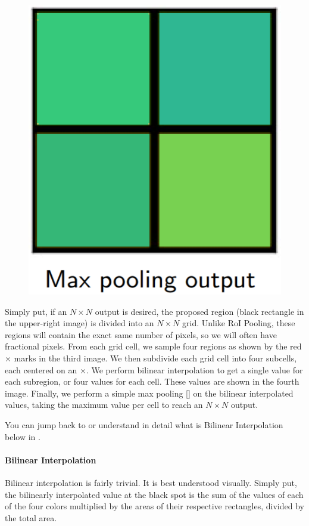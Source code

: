 \begin{figure}[H]
	\centering
	\includegraphics[scale=0.35]{images/roialign5.PNG}
\end{figure}

Simply put, if an $N\times N$ output is desired, the proposed region (black rectangle in the upper-right image) is divided into an $N\times N$ grid. Unlike RoI Pooling, these regions will contain the exact same number of pixels, so we will often have fractional pixels. From each grid cell, we sample four regions as shown by the red $\times$ marks in the third image. We then subdivide each grid cell into four subcells, each centered on an $\times$. We perform bilinear interpolation to get a single value for each subregion, or four values for each cell. These values are shown in the fourth image. Finally, we perform a simple max pooling [] on the bilinear interpolated values, taking the maximum value per cell to reach an $N\times N$ output. 

You can jump back to  or understand in detail what is Bilinear Interpolation below in .

\paragraph{Bilinear Interpolation}\label{s:roi-bi}
Bilinear interpolation is fairly trivial. It is best understood visually. Simply put, the bilinearly interpolated value at the black spot is the sum of the values of each of the four colors multiplied by the areas of their respective rectangles, divided by the total area.


